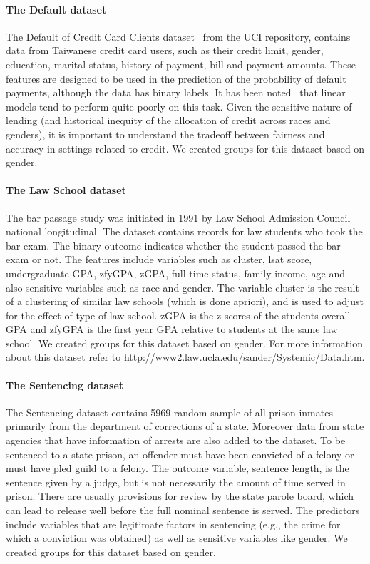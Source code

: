 \paragraph{The Default dataset}
The Default of Credit Card Clients dataset~\citep{default-dataset, uci-repo} from the UCI
repository, contains data from Taiwanese credit card
users, such as their credit limit, gender, education, marital status,
history of payment, bill and payment amounts. These features are
designed to be used in the prediction of the probability of default
payments, although the data has binary labels. It has been
noted~\citep{default-dataset} that linear models tend to perform quite
poorly on this task. Given the sensitive nature of lending (and
historical inequity of the allocation of credit across races and
genders), it is important to understand the tradeoff between fairness
and accuracy in settings related to credit. We created groups for this 
dataset based on gender.


\paragraph{The Law School dataset}
The bar passage study was initiated in 1991 by Law School Admission Council national longitudinal. 
The dataset contains  records for law students who took the bar exam. 
The binary outcome indicates whether the student passed the bar exam or not. The features include variables such 
as cluster, lsat score, undergraduate GPA, zfyGPA, zGPA, full-time status, family income, age and also sensitive 
variables such as race and gender. 
The variable cluster is the result of a clustering of similar law schools (which is done apriori), and is used to adjust for the 
effect of type of law school. zGPA is the z-scores of the students overall GPA and zfyGPA is the  first year GPA relative to 
students at the same law school. We created groups for this dataset based on gender.
For more information about this dataset refer to \url{http://www2.law.ucla.edu/sander/Systemic/Data.htm}.

\paragraph{The Sentencing dataset}
The Sentencing dataset contains 5969 random sample of all prison inmates primarily from the department of corrections of a state. 
Moreover data from state agencies that have information of arrests are
also added to the dataset. To be sentenced to a state prison, an offender must have been convicted of a felony or must have pled guild to a felony. 
The outcome variable, sentence length, is the sentence given by a judge, but is not necessarily the amount of time served in prison. 
There are usually provisions for review by the state parole board, which can lead to release well before the full nominal sentence is served. 
The predictors include variables that are legitimate factors in sentencing (e.g., the crime for which a conviction was obtained) as well as sensitive variables 
like gender.  We created groups for this dataset based on gender.






